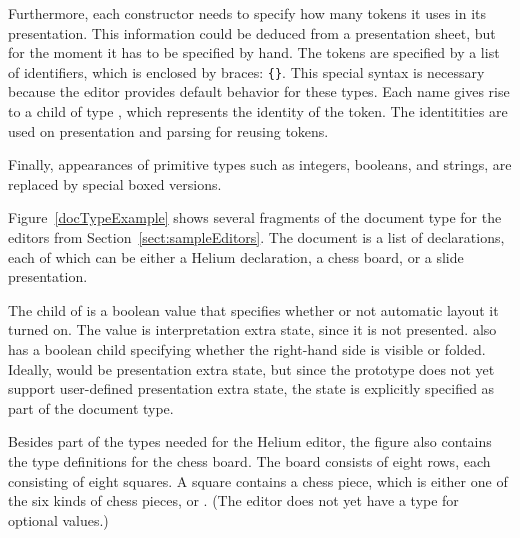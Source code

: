 
Furthermore, each constructor needs to specify how many tokens it uses in its presentation. This information could be deduced from a presentation sheet, but for the moment it has to be specified by hand.  The tokens are specified by a list of identifiers, which is enclosed by braces: 
\verb|{|\verb|}|. This special syntax is necessary because the editor provides default behavior for these types.  Each name gives rise to a child of type , which represents the identity of the token. The identitities are used on presentation and parsing for reusing tokens. 




Finally, appearances of primitive types such as integers, booleans, and strings, are replaced by special boxed versions. 


Figure~\ref{docTypeExample} shows several fragments of the document type for the editors from Section~\ref{sect:sampleEditors}. The document is a list of declarations, each of which can be either a Helium declaration, a chess board, or a slide presentation. 

The  child of  is a boolean value that specifies whether or not automatic layout it turned on. The value is interpretation extra state, since it is not presented.   also has a boolean child  specifying whether the right-hand side is visible or folded. Ideally,  would be presentation extra state, but since the prototype does not yet support user-defined presentation extra state, the  state is explicitly specified as part of the document type.

Besides part of the types needed for the Helium editor, the figure also contains the type definitions for the chess board. The board consists of eight rows, each consisting of eight squares. A square contains a chess piece, which is either one of the six kinds of chess pieces, or . (The editor does not yet have a  type for optional values.)

